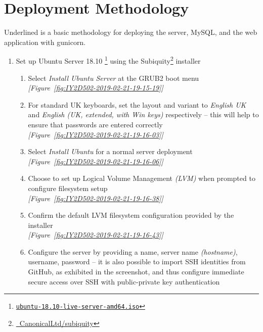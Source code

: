 \section{Deployment Methodology}
Underlined is a basic methodology for deploying the server, MySQL, and the web application with gunicorn.

\begin{enumerate}[leftmargin=0em,label=\protect\listlabelcircle{\arabic*}]
  \item Set up Ubuntu Server 18.10 \footnote{\href{http://releases.ubuntu.com/18.10/ubuntu-18.10-live-server-amd64.iso}{\texttt{ubuntu-18.10-live-server-amd64.iso}}} using the Subiquity\footnote{\href{https://github.com/CanonicalLtd/subiquity}{\faGithub\ CanonicalLtd/subiquity}} installer
    \begin{enumerate}[label=\roman*~\textcolor{light-gray}{|}]
      \item Select \textit{Install Ubuntu Server} at the GRUB2 boot menu\\
      \textcolor{deep-gray}{\textit{[Figure~\ref{fig:IY2D502-2019-02-21-19-15-19}]}}
      \item For standard UK keyboards, set the layout and variant to \textit{English {UK}} and \textit{English (UK, extended, with Win keys)} respectively -- this will help to ensure that passwords are entered correctly\\
      \textcolor{deep-gray}{\textit{[Figure~\ref{fig:IY2D502-2019-02-21-19-16-03}]}}
      \item Select \textit{Install Ubuntu} for a normal server deployment \\
      \textcolor{deep-gray}{\textit{[Figure~\ref{fig:IY2D502-2019-02-21-19-16-06}]}}
      \item Choose to set up Logical Volume Management \textit{(LVM)} when prompted to configure filesystem setup\\
      \textcolor{deep-gray}{\textit{[Figure~\ref{fig:IY2D502-2019-02-21-19-16-38}]}}
      \item Confirm the default LVM filesystem configuration provided by the installer \\
      \textcolor{deep-gray}{\textit{[Figure~\ref{fig:IY2D502-2019-02-21-19-16-43}]}}
      \item Configure the server by providing a name, server name \textit{(hostname)}, username, password -- it is also possible to import SSH identities from GitHub, as exhibited in the screenshot, and thus configure immediate secure access over SSH with public-private key authentication\\

\end{enumerate}
\end{enumerate}
